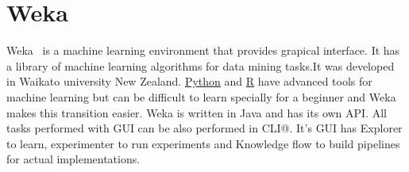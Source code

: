 \section{Weka}

Weka~\cite{hid-sp18-413-Weka} is a machine learning environment that provides
grapical interface. It has a library of machine learning algorithms for data
mining tasks.It was developed in Waikato university New
Zealand. \href{https://en.wikipedia.org/wiki/Python_(programming_language)}{Python}
and \href{https://en.wikipedia.org/wiki/R_(programming_language)}{R} have
advanced tools for machine learning but can be difficult to learn specially for
a beginner and Weka makes this transition easier. Weka is written in Java and has
its own API\@. All tasks performed with GUI can be also performed in CLI@\@. It's GUI
has Explorer to learn, experimenter to run experiments and Knowledge flow to
build pipelines for actual implementations.
